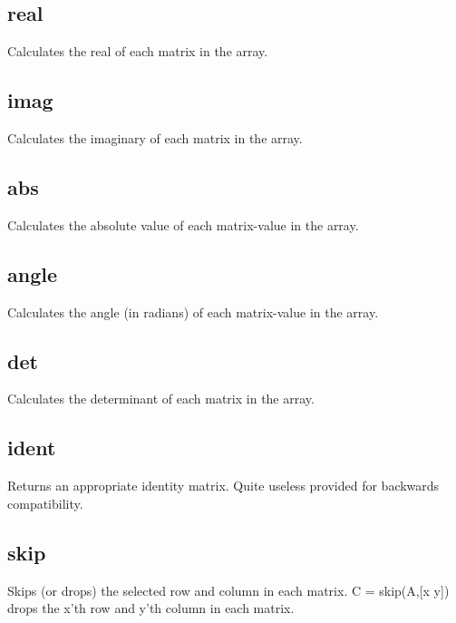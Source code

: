 \documentclass[11pt]{article}
\begin{document}
\subsection*{real}
Calculates the real of each matrix in the array.

\subsection*{imag}
Calculates the imaginary of each matrix in the array.

\subsection*{abs}
Calculates the absolute value of each matrix-value in the array.

\subsection*{angle}
Calculates the angle (in radians) of each matrix-value in the array.

\subsection*{det}
Calculates the determinant of each matrix in the array.

\subsection*{ident}
Returns an appropriate identity matrix. Quite useless provided for backwards compatibility.

\subsection*{skip}
Skips (or drops) the selected row and column in each matrix. C = skip(A,[x y]) drops the x'th row and y'th column in each matrix.


 
\end{document}
